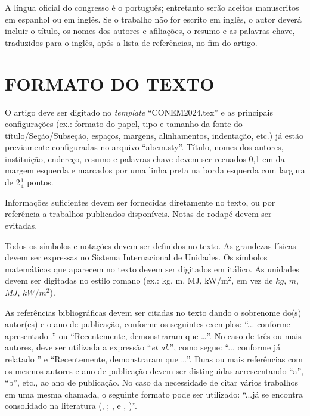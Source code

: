 \documentclass[10pt,fleqn,a4paper,twoside]{article}
\begin{document}
        A língua oficial do congresso é o português; entretanto serão aceitos manuscritos em espanhol ou em inglês. Se o trabalho não for escrito em inglês, o autor deverá incluir o título, os nomes dos autores e afiliações, o resumo e as palavras-chave, traduzidos para o inglês, após a lista de referências, no fim do artigo.


    \section{FORMATO DO TEXTO}
        
        O artigo deve ser digitado no \textit{template} ``CONEM2024.tex'' e as principais configurações (ex.: formato do papel, tipo e tamanho da fonte do título/Seção/Subseção, espaços, margens, alinhamentos, indentação, etc.) já estão previamente configuradas no arquivo ``abcm.sty''. Título, nomes dos autores, instituição, endereço, resumo e palavras-chave devem ser recuados 0,1 cm da margem esquerda e marcados por uma linha preta na borda esquerda com largura de 2$\frac{1}{4}$ pontos.
        
        Informações suficientes devem ser fornecidas diretamente no texto, ou por referência a trabalhos publicados disponíveis. Notas de rodapé devem ser evitadas. 
        
        Todos os símbolos e notações devem ser definidos no texto. As grandezas físicas devem ser expressas no Sistema Internacional de Unidades. Os símbolos matemáticos que aparecem no texto devem ser digitados em itálico. As unidades devem ser digitadas no estilo romano (ex.: kg, m, MJ, kW/m$^2$, em vez de $kg$, $m$, $MJ$, $kW/m^2$).
        
        As referências bibliográficas devem ser citadas no texto dando o sobrenome do(s) autor(es) e o ano de publicação, conforme os seguintes exemplos: ``... conforme apresentado \citep{MinwooShamim13}.'' ou ``Recentemente, \citet{MinwooShamim13} demonstraram que …''. No caso de três ou mais autores, deve ser utilizada a expressão ``\textit{et al.}'', como segue: ``... conforme já relatado \citep{Bordalo89}'' e ``Recentemente, \citet{Bordalo89} demonstraram que …''. Duas ou mais referências com os mesmos autores e ano de publicação devem ser distinguidas acrescentando ``a'', ``b'', etc., ao ano de publicação. No caso da necessidade de citar vários trabalhos em uma mesma chamada, o seguinte formato pode ser utilizado: ``...já se encontra consolidado na literatura (\citeauthor{Coimbra78}, \citeyear{Coimbra78}; \citeauthor{Clark86}, \citeyear{Clark86} e \citeauthor{Sparrow80},  \citeyear{Sparrow80})''.  
        
\end{document}
